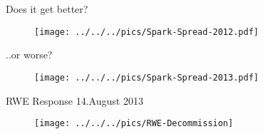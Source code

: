 {Does it get better?}
\begin{figure}[htp]
\centering
\texttt{[image: ../../../pics/Spark-Spread-2012.pdf]}
\end{figure}




{..or worse?}
\begin{figure}[htp]
\centering
\texttt{[image: ../../../pics/Spark-Spread-2013.pdf]}
\end{figure}



{RWE Response 14.August 2013}
\begin{figure}[htp]
\centering
\texttt{[image: ../../../pics/RWE-Decommission]}
\end{figure}












